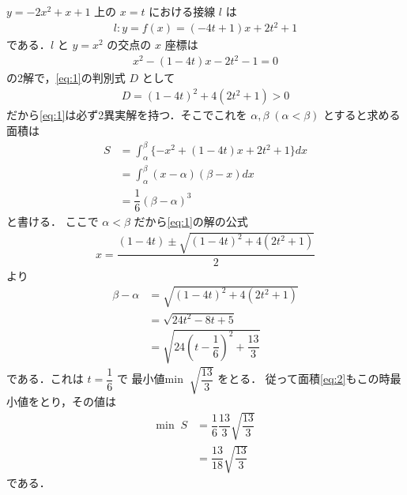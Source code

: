 \documentclass[../../main.tex]{subfiles}
\begin{document}
$y = -2x^2+x+1$ 上の $x=t$ における接線 $l$ は
\begin{align}
  l : y = f(x) = (-4t+1)x + 2t^2+1
\end{align}
である．$l$ と $y = x^2$ の交点の $x$ 座標は
\begin{align}
  x^2 - (1-4t)x - 2t^2 - 1 = 0 \label{eq:1}
\end{align}
の2解で，\cref{eq:1}の判別式 $D$ として
\begin{align}
  D = (1-4t)^2 + 4(2t^2+1) > 0
\end{align}
だから\cref{eq:1}は必ず2異実解を持つ．そこでこれを $\alpha, \beta \; (\alpha < \beta)$ とすると求める面積は
\begin{align}
  S
  &= \int_{\alpha}^{\beta} \{ -x^2 + (1-4t)x + 2t^2+1 \} dx \\
  &= \int_{\alpha}^{\beta} \left(x-\alpha\right)(\beta-x) dx \\
  &= \dfrac{1}{6}(\beta-\alpha)^3 \label{eq:2}
\end{align}
と書ける．
ここで $\alpha < \beta$ だから\cref{eq:1}の解の公式
\begin{align}
  x = \dfrac{(1-4t)\pm \sqrt{(1-4t)^2+4(2t^2+1)}}{2}
\end{align}
より
\begin{align}
  \beta - \alpha
  &= \sqrt{(1-4t)^2 + 4(2t^2+1)} \\
  &= \sqrt{24t^2-8t+5} \\
  &= \sqrt{24\left(t - \dfrac{1}{6}\right)^2 + \dfrac{13}{3}}
\end{align}
である．これは $t = \dfrac{1}{6}$ で 最小値$\text{min} \;\; \sqrt{\dfrac{13}{3}}$ をとる．
従って面積\cref{eq:2}もこの時最小値をとり，その値は
\begin{align}
  \text{min} \;\; S
  &= \dfrac{1}{6} \dfrac{13}{3} \sqrt{\dfrac{13}{3}} \\
  &= \dfrac{13}{18} \sqrt{\dfrac{13}{3}}
\end{align}
である．
\end{document}
